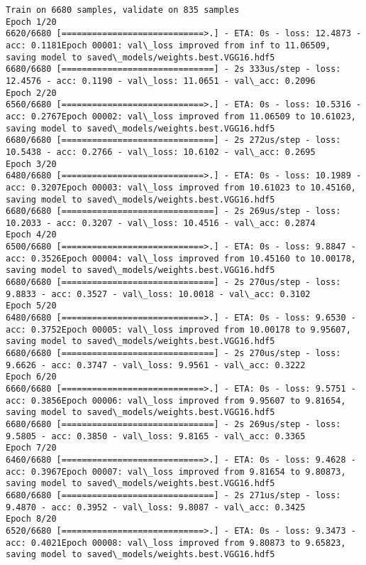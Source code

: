 \documentclass[11pt]{article}
\begin{document}
    \begin{Verbatim}[commandchars=\\\{\}]
Train on 6680 samples, validate on 835 samples
Epoch 1/20
6620/6680 [============================>.] - ETA: 0s - loss: 12.4873 - acc: 0.1181Epoch 00001: val\_loss improved from inf to 11.06509, saving model to saved\_models/weights.best.VGG16.hdf5
6680/6680 [==============================] - 2s 333us/step - loss: 12.4576 - acc: 0.1190 - val\_loss: 11.0651 - val\_acc: 0.2096
Epoch 2/20
6560/6680 [============================>.] - ETA: 0s - loss: 10.5316 - acc: 0.2767Epoch 00002: val\_loss improved from 11.06509 to 10.61023, saving model to saved\_models/weights.best.VGG16.hdf5
6680/6680 [==============================] - 2s 272us/step - loss: 10.5438 - acc: 0.2766 - val\_loss: 10.6102 - val\_acc: 0.2695
Epoch 3/20
6480/6680 [============================>.] - ETA: 0s - loss: 10.1989 - acc: 0.3207Epoch 00003: val\_loss improved from 10.61023 to 10.45160, saving model to saved\_models/weights.best.VGG16.hdf5
6680/6680 [==============================] - 2s 269us/step - loss: 10.2033 - acc: 0.3207 - val\_loss: 10.4516 - val\_acc: 0.2874
Epoch 4/20
6500/6680 [============================>.] - ETA: 0s - loss: 9.8847 - acc: 0.3526Epoch 00004: val\_loss improved from 10.45160 to 10.00178, saving model to saved\_models/weights.best.VGG16.hdf5
6680/6680 [==============================] - 2s 270us/step - loss: 9.8833 - acc: 0.3527 - val\_loss: 10.0018 - val\_acc: 0.3102
Epoch 5/20
6480/6680 [============================>.] - ETA: 0s - loss: 9.6530 - acc: 0.3752Epoch 00005: val\_loss improved from 10.00178 to 9.95607, saving model to saved\_models/weights.best.VGG16.hdf5
6680/6680 [==============================] - 2s 270us/step - loss: 9.6626 - acc: 0.3747 - val\_loss: 9.9561 - val\_acc: 0.3222
Epoch 6/20
6660/6680 [============================>.] - ETA: 0s - loss: 9.5751 - acc: 0.3856Epoch 00006: val\_loss improved from 9.95607 to 9.81654, saving model to saved\_models/weights.best.VGG16.hdf5
6680/6680 [==============================] - 2s 269us/step - loss: 9.5805 - acc: 0.3850 - val\_loss: 9.8165 - val\_acc: 0.3365
Epoch 7/20
6460/6680 [============================>.] - ETA: 0s - loss: 9.4628 - acc: 0.3967Epoch 00007: val\_loss improved from 9.81654 to 9.80873, saving model to saved\_models/weights.best.VGG16.hdf5
6680/6680 [==============================] - 2s 271us/step - loss: 9.4870 - acc: 0.3952 - val\_loss: 9.8087 - val\_acc: 0.3425
Epoch 8/20
6520/6680 [============================>.] - ETA: 0s - loss: 9.3473 - acc: 0.4021Epoch 00008: val\_loss improved from 9.80873 to 9.65823, saving model to saved\_models/weights.best.VGG16.hdf5

\end{Verbatim}
\end{document}
